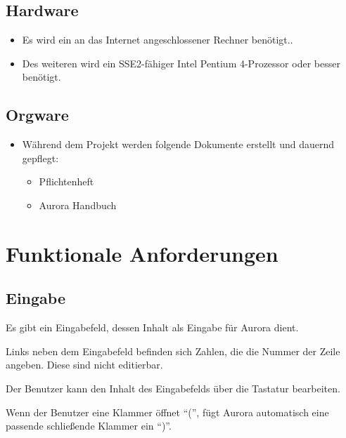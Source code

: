 \documentclass[parskip=full,11pt,twoside]{scrartcl}
\begin{document}
\subsection{Hardware}
	\begin{itemize}
		\item Es wird ein an das Internet angeschlossener Rechner benötigt..
		\item Des weiteren wird ein SSE2-fähiger Intel Pentium 4-Prozessor oder besser benötigt.
	\end{itemize}
\subsection{Orgware}
	\begin{itemize}
		\item Während dem Projekt werden folgende Dokumente erstellt und dauernd gepflegt:
			\begin{itemize}
				\item Pflichtenheft
				\item Aurora Handbuch
			\end{itemize}
	\end{itemize}
\newpage


\section{Funktionale Anforderungen}

\subsection{Eingabe}

Es gibt ein Eingabefeld, dessen Inhalt als Eingabe für Aurora dient.

Links neben dem Eingabefeld befinden sich Zahlen, die die Nummer der Zeile angeben. Diese sind nicht editierbar.

Der Benutzer kann den Inhalt des Eingabefelds über die Tastatur bearbeiten.

Wenn der Benutzer eine Klammer öffnet \enquote{(}, fügt Aurora automatisch eine passende schließende Klammer ein \enquote{)}.
\end{document}
